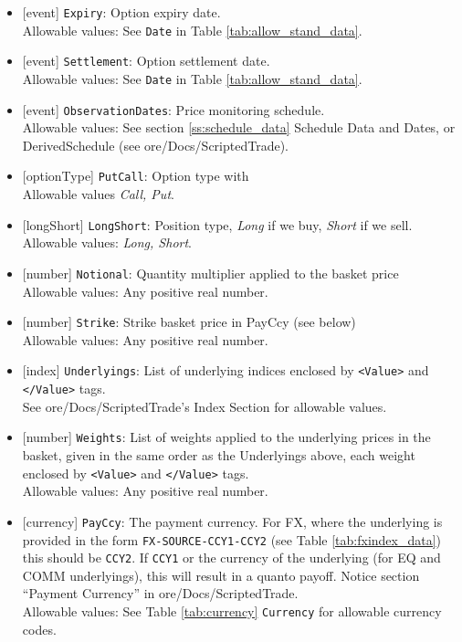 \begin{itemize}
    \item{}[event] \lstinline!Expiry!: Option expiry date. \\
    Allowable values: See \lstinline!Date! in Table \ref{tab:allow_stand_data}.
    \item{}[event] \lstinline!Settlement!: Option settlement date. \\
    Allowable values: See \lstinline!Date! in Table \ref{tab:allow_stand_data}.
    \item{}[event] \lstinline!ObservationDates!: Price monitoring schedule. \\
    Allowable values: See section \ref{ss:schedule_data} Schedule Data and Dates, or DerivedSchedule (see ore/Docs/ScriptedTrade).
    \item{}[optionType] \lstinline!PutCall!: Option type with \\
          Allowable values \emph{Call, Put}.
    \item{}[longShort] \lstinline!LongShort!: Position type,
          {\em Long} if we buy, {\em Short} if we sell.\\
    Allowable values: \emph{Long, Short}.
        \item{}[number] \lstinline!Notional!: Quantity multiplier applied to the
          basket price \\
          Allowable values: Any positive real number.
        \item{}[number] \lstinline!Strike!: Strike basket price in PayCcy (see
          below) \\
          Allowable values: Any positive real number.
    \item{}[index] \lstinline!Underlyings!: List of underlying indices
      enclosed by {\tt <Value>} and {\tt </Value>} tags. \\
      See ore/Docs/ScriptedTrade's Index Section for allowable values.
    \item{}[number] \lstinline!Weights!: List of weights applied to the
          underlying prices in the basket, given in the same order as
          the Underlyings above, each weight enclosed by {\tt <Value>} and {\tt </Value>} tags.\\
          Allowable values: Any positive real number.
    \item{}[currency] \lstinline!PayCcy!: The payment currency. For FX, where the underlying is provided
      in the form \lstinline!FX-SOURCE-CCY1-CCY2! (see Table \ref{tab:fxindex_data}) this should
      be \lstinline!CCY2!. If \lstinline!CCY1! or the currency of the underlying (for EQ and
      COMM underlyings), this will result in a quanto payoff. Notice section ``Payment Currency'' in ore/Docs/ScriptedTrade. \\
        Allowable values: See Table \ref{tab:currency} \lstinline!Currency! for allowable currency codes.
\end{itemize}

